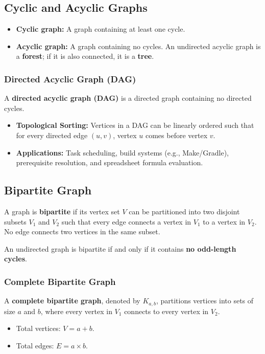 \subsection{Cyclic and Acyclic Graphs}
\begin{itemize}
    \item \textbf{Cyclic graph:} A graph containing at least one cycle.
    \item \textbf{Acyclic graph:} A graph containing no cycles. An undirected acyclic graph is a \textbf{forest}; if it is also connected, it is a \textbf{tree}.
\end{itemize}

\subsubsection{Directed Acyclic Graph (DAG)}
A \textbf{directed acyclic graph (DAG)} is a directed graph containing no directed cycles.
\begin{itemize}
    \item \textbf{Topological Sorting:} Vertices in a DAG can be linearly ordered such that for every directed edge $(u, v)$, vertex $u$ comes before vertex $v$.
    \item \textbf{Applications:} Task scheduling, build systems (e.g., Make/Gradle), prerequisite resolution, and spreadsheet formula evaluation.
\end{itemize}

\subsection{Bipartite Graph}
A graph is \textbf{bipartite} if its vertex set $V$ can be partitioned into two disjoint subsets $V_1$ and $V_2$ such that every edge connects a vertex in $V_1$ to a vertex in $V_2$. No edge connects two vertices in the same subset.

\begin{tcolorbox}[title=\textbf{Fundamental Theorem on Bipartite Graphs}]
An undirected graph is bipartite if and only if it contains \textbf{no odd-length cycles}.
\end{tcolorbox}

\subsubsection{Complete Bipartite Graph}
A \textbf{complete bipartite graph}, denoted by $K_{a, b}$, partitions vertices into sets of size $a$ and $b$, where every vertex in $V_1$ connects to every vertex in $V_2$.
\begin{itemize}
    \item Total vertices: $V = a + b$.
    \item Total edges: $\boxed{E = a \times b}$.
\end{itemize}

